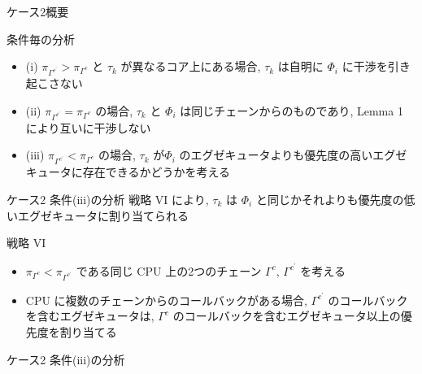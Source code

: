 \begin{frame}{ケース2概要}
\end{frame}

\begin{frame}{条件毎の分析}
    \begin{itemize}
        \item (i) $\pi_{\Gamma^{c^{\prime}}}>\pi_{\Gamma^{c}}$ と $\tau_{k}$ が異なるコア上にある場合, $\tau_{k}$ は自明に $\Phi_{i}$ に干渉を引き起こさない
        \item (ii) $\pi_{\Gamma^{c^{\prime}}}=\pi_{\Gamma^{c}}$ の場合, $\tau_{k}$ と $\Phi_{i}$ は同じチェーンからのものであり, Lemma 1 により互いに干渉しない
        \item (iii) $\pi_{\Gamma^{c^{\prime}}}<\pi_{\Gamma^{c}}$ の場合, $\tau_{k}$ が$\Phi_{i}$ のエグゼキュータよりも優先度の高いエグゼキュータに存在できるかどうかを考える
    \end{itemize}
\end{frame}

\begin{frame}{ケース2 条件(iii)の分析}
    戦略 VI により, $\tau_{k}$ は $\Phi_{i}$ と同じかそれよりも優先度の低いエグゼキュータに割り当てられる
    \begin{block}{戦略 VI}
        \setlength{\linewidth}{0.98\columnwidth}
        \begin{itemize}
            \item $\pi_{\Gamma^{c}}<\pi_{\Gamma^{c^{\prime}}}$ である同じ CPU 上の2つのチェーン $\Gamma^{c}$, $\Gamma^{c^{\prime}}$ を考える
            \item CPU に複数のチェーンからのコールバックがある場合, $\Gamma^{c^{\prime}}$ のコールバックを含むエグゼキュータは, $\Gamma^{c}$ のコールバックを含むエグゼキュータ以上の優先度を割り当てる
        \end{itemize}
    \end{block}
\end{frame}

\begin{frame}{ケース2 条件(iii)の分析}
\end{frame}


